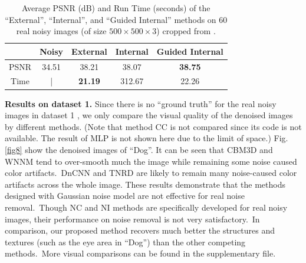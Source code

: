 \begin{table}\vspace{-4mm}
\caption{Average PSNR (dB) and Run Time (seconds) of the ``External'', ``Internal'', and ``Guided Internal'' methods on 60 real noisy images (of size $500\times500\times3$) cropped from \cite{crosschannel2016}.}
\vspace{-4mm}
\label{tab1}
\begin{center}
\renewcommand\arraystretch{1}
\begin{tabular}{|c||c|c|c|c|}
\hline
 & \small\textbf{Noisy} &\small \textbf{External} & \small\textbf{Internal} & \small\textbf{Guided Internal}  
\\
\hline
PSNR & 34.51 & 38.21 & 38.07 & \textbf{38.75} 
\\
\hline
Time & | &  \textbf{21.19}  & 312.67 & 22.26
\\
\hline
\end{tabular}
\end{center}
\vspace{-3mm}
\end{table}

\textbf{Results on dataset 1.}
Since there is no ``ground truth'' for the real noisy images in  dataset 1 \cite{ncwebsite}, we only compare the visual quality of the denoised images by different methods. (Note that method CC \cite{crosschannel2016} is not compared since its code is not available. The result of MLP is not shown here due to the limit of space.) Fig. \ref{fig8} show the denoised images of ``Dog''. It can be seen that CBM3D and WNNM tend to over-smooth much the image while remaining some noise caused color artifacts.\ DnCNN and TNRD are likely to remain many noise-caused color artifacts across the whole image. These results demonstrate that the methods designed with Gaussian noise model are not effective for real noise removal.\ Though NC and NI methods are specifically developed for real noisy images, their performance on noise removal is not very satisfactory.\ In comparison, our proposed method recovers much better the structures and textures (such as the eye area in ``Dog'') than the other competing methods.\ More visual comparisons can be found in the supplementary file.



